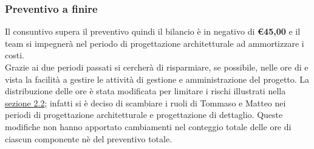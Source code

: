 \subsubsection{Preventivo a finire}
Il consuntivo supera il preventivo quindi il bilancio è in negativo di \textbf{\euro45,00} e il team si impegnerà nel periodo di progettazione architetturale ad ammortizzare i costi.\\
Grazie ai due periodi passati si cercherà di risparmiare, se possibile, nelle ore di \AM{} e \RES{} vista la facilità a gestire le attività di gestione e amministrazione del progetto.
La distribuzione delle ore è stata modificata per limitare i rischi illustrati nella \hyperref[sez2.2]{sezione 2.2}; infatti si è deciso di scambiare i ruoli di Tommaso e Matteo nei periodi di progettazione architetturale e progettazione di dettaglio. Queste modifiche non hanno apportato cambiamenti nel conteggio totale delle ore di ciascun componente nè del preventivo totale.